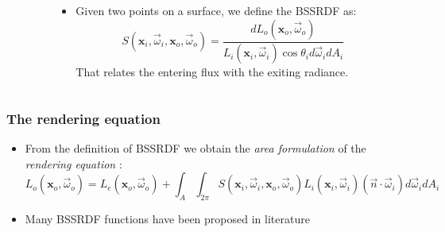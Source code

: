\documentclass{beamer}
\newcommand{\vomega}{\vec{\omega}}
\newcommand{\x}{\mathbf{x}}
\begin{document}
\begin{frame}
\begin{columns}
\begin{column}{0.4\textwidth}
				\end{column}
    \begin{column}{0.6\textwidth}
		\begin{itemize}
				\item Given two points on a surface, we define the BSSRDF as:
$$
S(\x_i, \vomega_i, \x_o, \vomega_o) = \frac{d L_o(\x_o,\vomega_o)}{L_i(\x_i,\vomega_i) \cos \theta_i d\vomega_i d A_i}  
$$			
				That relates the entering flux with the exiting radiance.
		\end{itemize}
    \end{column}
​  \end{columns}
\end{frame}

\begin{frame}
    \frametitle{The rendering equation}
			\begin{itemize}
				\item From the definition of BSSRDF we obtain the \emph{area formulation} of the \emph{rendering equation} \citep{Jensen:2001:PMS:383259.383319}:
				$$L_o(\x_o,\vomega_o) = L_e(\x_o,\vomega_o) + \int_A \int_{2\pi} S(\x_i, \vomega_i, \x_o, \vomega_o) L_i(\x_i,\vomega_i) (\vec{n} \cdot \vomega_i) d\vomega_i d A_i$$
				\item Many BSSRDF functions have been proposed in literature \citep{Jensen:2001:PMS:383259.383319,D'Eon:2011:QMR:1964921.1964951,IMM2013-06646}  
			\end{itemize}
\end{frame}
\end{document}
